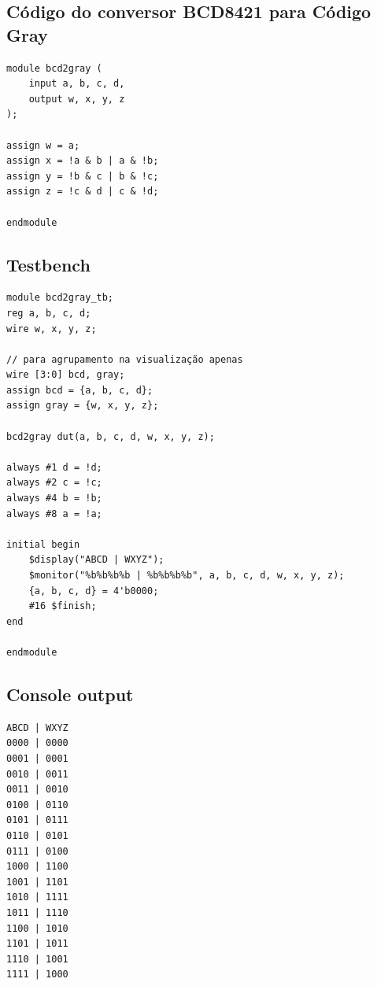 \documentclass{article}
\begin{document}
\subsection{Código do conversor BCD8421 para Código Gray}
\begin{verbatim}
module bcd2gray (
    input a, b, c, d,
    output w, x, y, z
);

assign w = a;
assign x = !a & b | a & !b;
assign y = !b & c | b & !c;
assign z = !c & d | c & !d;

endmodule
\end{verbatim}

\subsection{Testbench}
\begin{verbatim}
module bcd2gray_tb;
reg a, b, c, d;
wire w, x, y, z;

// para agrupamento na visualização apenas
wire [3:0] bcd, gray;
assign bcd = {a, b, c, d};
assign gray = {w, x, y, z};

bcd2gray dut(a, b, c, d, w, x, y, z);

always #1 d = !d;
always #2 c = !c;
always #4 b = !b;
always #8 a = !a;

initial begin
    $display("ABCD | WXYZ");
    $monitor("%b%b%b%b | %b%b%b%b", a, b, c, d, w, x, y, z);
    {a, b, c, d} = 4'b0000;
    #16 $finish;
end

endmodule
\end{verbatim}

\subsection{Console output}
\begin{verbatim}
ABCD | WXYZ
0000 | 0000
0001 | 0001
0010 | 0011
0011 | 0010
0100 | 0110
0101 | 0111
0110 | 0101
0111 | 0100
1000 | 1100
1001 | 1101
1010 | 1111
1011 | 1110
1100 | 1010
1101 | 1011
1110 | 1001
1111 | 1000
\end{verbatim}
\end{document}

